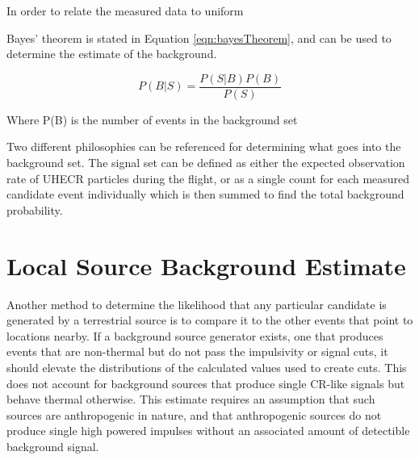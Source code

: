 	In order to relate the measured data to uniform 
	
	Bayes' theorem is stated in Equation \ref{eqn:bayesTheorem}, and can be used to determine the estimate of the background.

	\begin{equation}
		P(B | S) = \frac{P(S | B) P(B)}{P(S)}
	\label{eqn:bayesTheorem}
	\end{equation}
	
	Where P(B) is the number of events in the background set
	
	Two different philosophies can be referenced for determining what goes into the background set.  The signal set can be defined as either the expected observation rate of UHECR particles during the flight, or as a single count for each measured candidate event individually which is then summed to find the total background probability.		
		
		
\section{Local Source Background Estimate}
	Another method to determine the likelihood that any particular candidate is generated by a terrestrial source is to compare it to the other events that point to locations nearby.  If a background source generator exists, one that produces events that are non-thermal but do not pass the impulsivity or signal cuts, it should elevate the distributions of the calculated values used to create cuts.  This does not account for background sources that produce single CR-like signals but behave thermal otherwise.  This estimate requires an assumption that such sources are anthropogenic in nature, and that anthropogenic sources do not produce single high powered impulses without an associated amount of detectible background signal.
	



		
